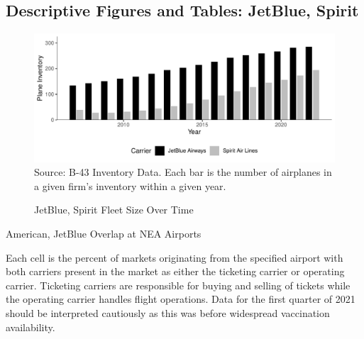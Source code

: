 \documentclass{article}
\begin{document}
\begin{appendices}
    \FloatBarrier\pagebreak

	\subsection{Descriptive Figures and Tables: JetBlue, Spirit}
	\begin{figure}[h]
	\caption{JetBlue, Spirit Fleet Size Over Time}
	\label{fig:Both_fleet}
	\includegraphics[width = \linewidth]{Both_Planes.pdf}
	\footnotesize{Source: B-43 Inventory Data. Each bar is the number of airplanes in a given firm's inventory within a given year.}
\end{figure}


\begin{table}[h]
		\caption{American, JetBlue Overlap at NEA Airports}
		\label{tab:NEA_Airport_Prescence}
        \vspace{-15mm}
        \begin{center}
         
        \end{center}
                \vspace{-5mm}
		\footnotesize{Each cell is the percent of markets originating from the specified airport with both carriers present in the market as either the ticketing carrier or operating carrier. Ticketing carriers are responsible for buying and selling of tickets while the operating carrier handles flight operations. Data for the first quarter of 2021 should be interpreted cautiously as this was before widespread vaccination availability.}
\end{table}


\end{appendices}
\end{document}
